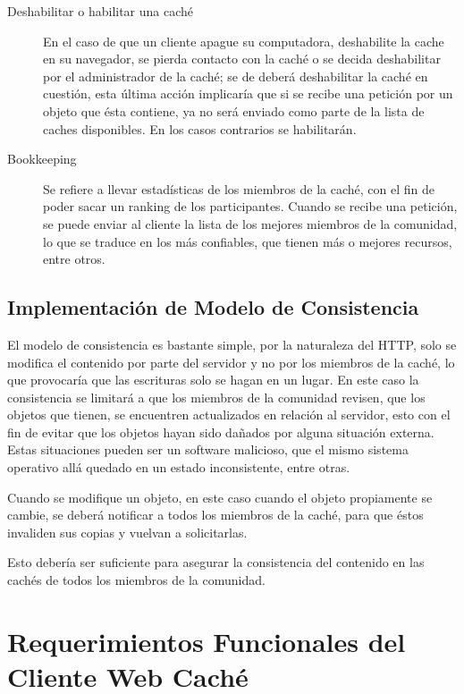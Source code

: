\begin{description}
\item[Deshabilitar o habilitar una caché] En el caso de que un cliente apague su computadora, deshabilite la cache en su navegador, se pierda contacto con la caché o se decida deshabilitar por el administrador de la caché; se de deberá deshabilitar la caché en cuestión, esta última acción implicaría que si se recibe una petición por un objeto que ésta contiene, ya no será enviado como parte de la lista de caches disponibles. En los casos contrarios se habilitarán.

\item [Bookkeeping] Se refiere a llevar estadísticas de los miembros de la caché, con el fin de poder sacar un ranking de los participantes. Cuando se recibe una petición, se puede enviar al cliente la lista de los mejores miembros de la comunidad, lo que se traduce en los más confiables, que tienen más o mejores recursos, entre otros.

\end{description}


\subsection{Implementación de Modelo de Consistencia}
El modelo de consistencia es bastante simple, por la naturaleza del HTTP, solo se modifica el contenido por parte del servidor y no por los miembros de la caché, lo que provocaría que las escrituras solo se hagan en un lugar. En este caso la consistencia se limitará a que los miembros de la comunidad revisen, que los objetos que tienen, se encuentren actualizados en relación al servidor, esto con el fin de evitar que los objetos hayan sido dañados por alguna situación externa. Estas situaciones pueden ser un software malicioso, que el mismo sistema operativo allá quedado en un estado inconsistente, entre otras.

Cuando se modifique un objeto, en este caso cuando el objeto propiamente se cambie, se deberá notificar a todos los miembros de la caché, para que éstos invaliden sus copias y vuelvan a solicitarlas. 

Esto debería ser suficiente para asegurar la consistencia del contenido en las cachés de todos los miembros de la comunidad. 


\section{Requerimientos Funcionales del Cliente Web Caché}

